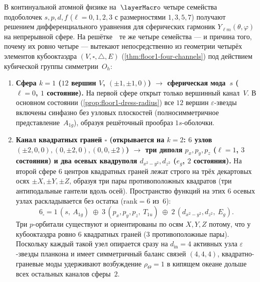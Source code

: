 В континуальной атомной физике на~$\layerMacro$ четыре семейства подоболочек $s,p,d,f$
($\ell=0,1,2,3$ с размерностями $1,3,5,7$) получают решением дифференциального уравнения
для сферических гармоник $Y_{\ell m}(\theta,\varphi)$ на непрерывной сфере.
На решётке~\latGCKshort\ те же четыре семейства --- и причина того, почему их ровно четыре ---
вытекают непосредственно из геометрии четырёх элементов кубооктаэдра $(V,\square,\triangle,E)$
(\cref{thm:floor1-four-channels}) под действием кубической группы симметрии~$O_h$:

\begin{enumerate}[leftmargin=*]
\item \textbf{Сфера $k=1$ ($12$ вершин $V$, $(\pm 1,\pm 1,0)$) $\longrightarrow$ сферическая мода~$s$ ($\ell=0$, $1$ состояние).}
  На первой сфере открыт только вершинный канал~$V$.
  В основном состоянии (\cref{prop:floor1-dress-radius}) все $12$ вершин $\varepsilon$-звезды
  включены синфазно без узловых плоскостей (полносимметричное представление~$A_{1g}$),
  образуя решёточный прообраз $1s$-оболочки.

\item \textbf{Канал квадратных граней $\square$ (открывается на $k=2$: $6$ узлов $(\pm 2,0,0),(0,\pm 2,0),(0,0,\pm 2)$)
  $\longrightarrow$ три диполя $p_x,p_y,p_z$ ($\ell=1$, $3$ состояния) и два осевых квадруполя $d_{x^2-y^2},d_{z^2}$ ($e_g$, $2$ состояния).}
  На второй сфере $6$ центров квадратных граней лежат строго на трёх декартовых осях $\pm X,\pm Y,\pm Z$,
  образуя три пары противоположных квадратов (три антиподальные гантели вдоль осей).
  Пространство функций на этих $6$ осевых узлах раскладывается без остатка ($\mathrm{rank}=6$ из~$6$):
  \[
    6_{\square}
    = 1\,(s,\ A_{1g})
    \;\oplus\;
    3\,(p_x,p_y,p_z,\ T_{1u})
    \;\oplus\;
    2\,(d_{x^2-y^2},d_{z^2},\ E_g).
  \]
  Три $p$-орбитали существуют и ориентированы по осям $X,Y,Z$ потому, что у кубооктаэдра ровно $6$ квадратных граней
  ($3$ противоположные пары). Поскольку каждый такой узел опирается сразу на $d_{\mathrm{in}}=4$ активных узла
  $\varepsilon$-звезды планкона и имеет симметричный баланс связей $(4,4,4)$, квадратно-граневые моды
  удерживают возбуждение $\rho_\Theta=1$ в кипящем океане дольше всех остальных каналов сферы~$2$.


\end{enumerate}
